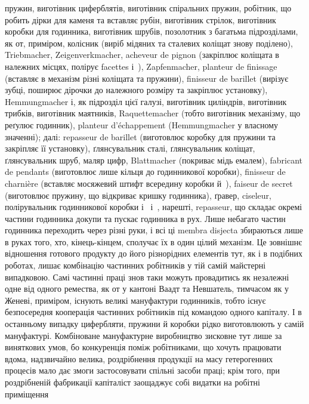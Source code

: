 \parcont{}  %
пружин, виготівник циферблятів, виготівник спіральних пружин,
робітник, що робить дірки для каменя та вставляє рубін, виготівник
стрілок, виготівник коробки для годинника, виготівник
шрубів, позолотник з багатьма підрозділами, як от, приміром,
колісник (виріб мідяних та сталевих коліщат знову поділено),
Triebmacher, Zeigenverkmacher, acheveur de pignon (закріплює
коліщата в належних місцях, полірує facettes і~), Zapfenmacher,
planteur de finissage (вставляє в механізм різні коліщата
та пружини), finisseur de barillet (вирізує зубці, поширює дірочки
до належного розміру та закріплює установку), Hemmungmacher
і, як підрозділ цієї галузі, виготівник циліндрів, виготівник
трибків, виготівник маятників, Raquettemacher (тобто виготівник
механізму, що реґулює годинник), planteur d’échappement
(Hemmungmacher у власному значенні); далі: repasseur de barillet
(виготовлює коробку для пружини та закріпляє її установку),
ґлянсувальник сталі, ґлянсувальник коліщат, ґлянсувальник
шруб, маляр цифр, Blattmacher (покриває мідь емалем),
fabricant de pendants (виготовлює лише кільця до годинникової
коробки), finisseur de charnière (вставляє мосяжевий штифт
всередину коробки й~), faiseur de secret (виготовлює пружину,
що відкриває кришку годинника), ґравер, ciseleur, полірувальник
годинникової коробки і~ і~, нарешті, repasseur, що
складає окремі частини годинника докупи та пускає годинника
в рух. Лише небагато частин годинника переходить через різні
руки, і всі ці membra disjecta збираються лише в руках того,
хто, кінець-кінцем, сполучає їх в один цілий механізм. Це
зовнішнє відношення готового продукту до його різнорідних
елементів тут, як і в подібних роботах, лишає комбінацію частинних
робітників у тій самій майстерні випадковою. Самі
частинні праці знов таки можуть провадитись як незалежні
одне від одного ремества, як от у кантоні Ваадт та Невшатель,
тимчасом як у Женеві, приміром, існують великі мануфактури
годинників, тобто існує безпосередня кооперація частинних робітників
під командою одного капіталу. І в останньому випадку
цифербляти, пружини й коробки рідко виготовлюють у самій
мануфактурі. Комбіноване мануфактурне виробництво зисковне
тут лише за виняткових умов, бо конкуренція поміж робітниками,
що хочуть працювати вдома, надзвичайно велика, роздрібнення
продукції на масу гетерогенних процесів мало дає змоги застосовувати
спільні засоби праці; крім того, при роздрібненій фабрикації
капіталіст заощаджує собі видатки на робітні приміщення
